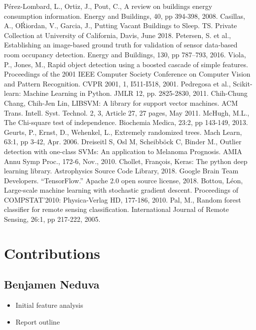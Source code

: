 \documentclass[letterpaper, 12 pt, conference]{ieeeconf}  %
\begin{document}
\begin{thebibliography}{99}

 Pérez-Lombard, L., Ortiz, J., Pout, C., A review on buildings energy consumption information. Energy and Buildings, 40, pp 394-398, 2008.
 Casillas, A., O{\' R}iordan, V., Garcia, J., Putting Vacant Buildings to Sleep. TS. Private Collection at University of California, Davis, June 2018.
 Petersen, S. et al., Establishing an image-based ground truth for validation of sensor data-based room occupancy detection. Energy and Buildings, 130, pp 787–793, 2016.
 Viola, P., Jones, M., Rapid object detection using a boosted cascade of simple features. Proceedings of the 2001 IEEE Computer Society Conference on Computer Vision and Pattern Recognition. CVPR 2001, 1, I511-I518, 2001. 
 Pedregosa et al., Scikit-learn: Machine Learning in Python. JMLR 12, pp. 2825-2830, 2011.
 Chih-Chung Chang, Chih-Jen Lin, LIBSVM: A library for support vector machines. ACM Trans. Intell. Syst. Technol. 2, 3, Article 27, 27 pages, May 2011.
 McHugh, M.L., The Chi-square test of independence. Biochemia Medica, 23:2, pp 143-149, 2013.
 Geurts, P., Ernst, D., Wehenkel, L., Extremely randomized trees. Mach Learn, 63:1, pp 3-42, Apr. 2006.
 Dreiseitl S, Osl M, Scheibb{\"o}ck C, Binder M., Outlier detection with one-class SVMs: An application to Melanoma Prognosis. AMIA Annu Symp Proc., 172-6, Nov., 2010.
 Chollet, Fran{\c c}ois, Keras: The python deep learning library. Astrophysics Source Code Library, 2018.
 Google Brain Team Developers. “TensorFlow.” Apache 2.0 open source license, 2018.
 Bottou, L{\' e}on, Large-scale machine learning with stochastic gradient descent. Proceedings of COMPSTAT'2010: Physica-Verlag HD, 177-186, 2010.
 Pal, M., Random forest classifier for remote sensing classification. International Journal of Remote Sensing, 26:1, pp 217-222, 2005.



\end{thebibliography}

\section{Contributions}

\subsection*{Benjamen Neduva}
        \begin{itemize}
                \item Initial feature analysis
                \item Report outline
        \end{itemize}
\end{document}

